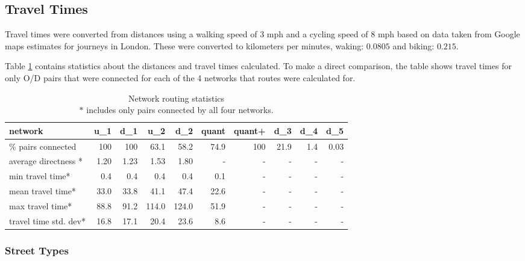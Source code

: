 \subsection{Travel Times}

Travel times were converted from distances using a walking speed of 3 mph and a cycling speed of 8 mph based on data taken from Google maps estimates for journeys in London. These were converted to kilometers per minutes, waking: $0.0805$ and biking: $0.215$. 

Table \ref{table:travel_time_stats} contains statistics about the distances and travel times calculated. To make a direct comparison, the table shows travel times for only O/D pairs that were connected for each of the 4 networks that routes were calculated for.  

\begin{table}[]
\begin{tabular}{lrrrrrrrrr}
\toprule
network                  & u\_1    & d\_1    & u\_2  & d\_2  & quant & quant+ & d\_3 & d\_4 & d\_5 \\ \midrule
\% pairs connected       & 100     & 100     &  63.1 & 58.2  & 74.9  & 100    & 21.9 & 1.4  & 0.03 \\
average directness *     & 1.20    & 1.23    & 1.53  & 1.80  & -     & -      & -    & -    & -    \\
min travel time*         & 0.4     & 0.4     & 0.4   & 0.4   & 0.1   & -      & -    & -    & -    \\
mean travel time*        & 33.0    & 33.8    & 41.1  & 47.4  & 22.6  & -      & -    & -    & -    \\
max travel time*         & 88.8    & 91.2    & 114.0 & 124.0 & 51.9  & -      & -    & -    & -    \\
travel time std. dev*    & 16.8    & 17.1    & 20.4  & 23.6  & 8.6   & -      & -    & -    & -   \\ \bottomrule
\end{tabular}
\caption{Network routing statistics \\ $*$ includes only pairs connected by all four networks.}
\label{table:travel_time_stats}
\end{table}

\subsubsection{Street Types}

